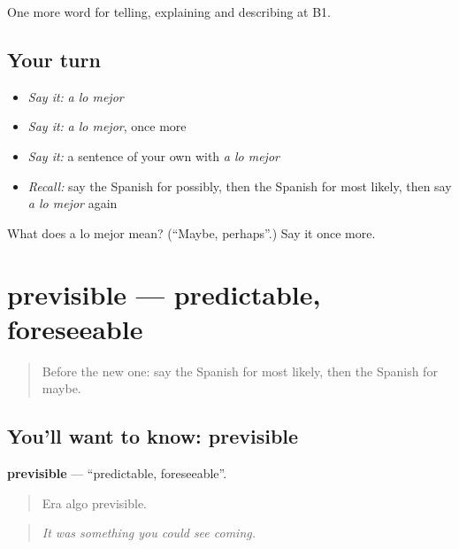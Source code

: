\begin{grammarlens}[title={What you've built}]
One more word for telling, explaining and describing at B1.
\end{grammarlens}

\subsection*{Your turn}
\begin{itemize}
\raggedright
  \item \emph{Say it:} \emph{a lo mejor}
  \item \emph{Say it:} \emph{a lo mejor}, once more
  \item \emph{Say it:} a sentence of your own with \emph{a lo mejor}
  \item \emph{Recall:} say the Spanish for possibly, then the Spanish for most likely, then say \emph{a lo mejor} again
\end{itemize}

\begin{tcolorbox}[breakable,colback=teal!4,colframe=teal!35!black,title={Before you move on}]
What does a lo mejor mean? (\textquotedblleft{}Maybe, perhaps\textquotedblright{}.) Say it once more.
\end{tcolorbox}
\section[previsible]{previsible — predictable, foreseeable}

\label{lesson:ES-C619-previsible}



\begin{quote}
Before the new one: say the Spanish for most likely, then the Spanish for maybe.
\end{quote}

\subsection*{You'll want to know: previsible}
\textbf{previsible} — \textquotedblleft{}predictable, foreseeable\textquotedblright{}.

\begin{quote}
Era algo previsible.
\end{quote}

\begin{quote}
\emph{It was something you could see coming.}
\end{quote}

